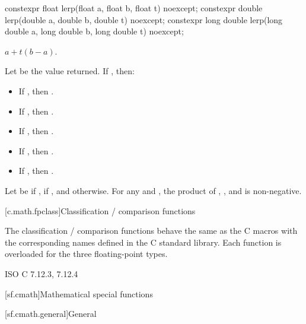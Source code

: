 %
\begin{itemdecl}
constexpr float lerp(float a, float b, float t) noexcept;
constexpr double lerp(double a, double b, double t) noexcept;
constexpr long double lerp(long double a, long double b, long double t) noexcept;
\end{itemdecl}
\begin{itemdescr}
\pnum
\returns
$a+t(b-a)$.

\pnum
\remarks
Let  be the value returned.
If , then:
\begin{itemize}
\item If , then .
\item If , then .
\item If , then .
\item If , then .
\item If , then .
\end{itemize}
Let  be  if ,
 if , and  otherwise.
For any  and , the product of
,
, and
is non-negative.
\end{itemdescr}

[c.math.fpclass]{Classification / comparison functions}

\pnum
The classification / comparison functions behave the same as the C macros with the
corresponding names defined in the C standard library.
Each function is overloaded for the three floating-point types.

\xref
ISO C 7.12.3, 7.12.4

[sf.cmath]{Mathematical special functions}%

[sf.cmath.general]{General}%
%

